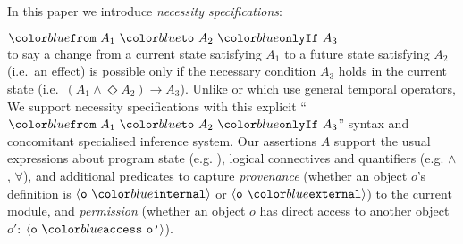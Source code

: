 In this paper we introduce \textit{necessity specifications}:\\
\strut \hspace{1.5in} $\onlyIf {A_1} {A_2} {A_3}$ \\
to say a change from a current state satisfying $A_1$ to a future
state satisfying $A_2$ (i.e.\ an effect) is possible only if the necessary condition
$A_3$ holds in the current state
%
(i.e.\ $(A_1 \wedge \Diamond A_2) \longrightarrow A_3$).
%
Unlike \citeauthor{VerX} or \citeauthor{FASE}
which use general temporal operators, 
We support necessity specifications with this explicit
%
``$\onlyIf {A_1} {A_2} {A_3}$'' syntax
%
and concomitant specialised inference system.
%
%
Our assertions $A$ support the usual expressions about program state
(e.g. ), logical connectives and quantifiers
(e.g. $\wedge$, $\forall$), and additional predicates
to capture \textit{provenance} (whether an object $o$'s definition is
$\internal{\texttt{o}}$ or $\external{\texttt{o}}$) to the current
module, and \textit{permission} \cite{miller-esop2013} (whether an
object $o$ has direct access to another object $o'$:
$\access{\texttt{o}}{\texttt{o'}}$).
 

  
 
 
